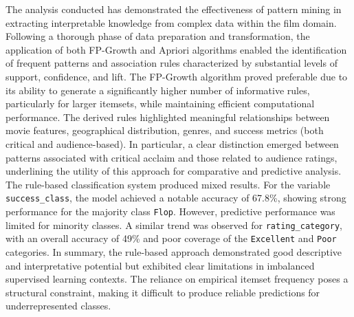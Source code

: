 \documentclass[10pt]{article}
\begin{document}
The analysis conducted has demonstrated the effectiveness of pattern mining in extracting interpretable knowledge from complex data within the film domain. Following a thorough phase of data preparation and transformation, the application of both FP-Growth and Apriori algorithms enabled the identification of frequent patterns and association rules characterized by substantial levels of support, confidence, and lift.
The FP-Growth algorithm proved preferable due to its ability to generate a significantly higher number of informative rules, particularly for larger itemsets, while maintaining efficient computational performance.
The derived rules highlighted meaningful relationships between movie features, geographical distribution, genres, and success metrics (both critical and audience-based). In particular, a clear distinction emerged between patterns associated with critical acclaim and those related to audience ratings, underlining the utility of this approach for comparative and predictive analysis.
The rule-based classification system produced mixed results. For the variable \texttt{success\_class}, the model achieved a notable accuracy of 67.8\%, showing strong performance for the majority class \texttt{Flop}. However, predictive performance was limited for minority classes. A similar trend was observed for \texttt{rating\_category}, with an overall accuracy of 49\% and poor coverage of the \texttt{Excellent} and \texttt{Poor} categories.
In summary, the rule-based approach demonstrated good descriptive and interpretative potential but exhibited clear limitations in imbalanced supervised learning contexts. The reliance on empirical itemset frequency poses a structural constraint, making it difficult to produce reliable predictions for underrepresented classes.
\end{document}
